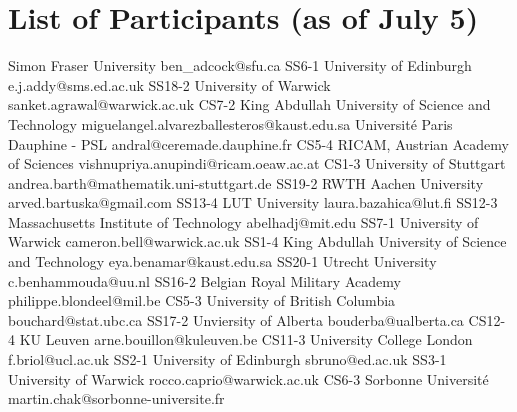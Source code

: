 \chapter{List of Participants (as of July 5)}

\setlength{\columnsep}{1cm}

\begin{multicols}{2}

\small


{ Simon Fraser University }
{ ben_adcock@sfu.ca }
{SS6-1}
{}
{ University of Edinburgh }
{ e.j.addy@sms.ed.ac.uk }
{SS18-2}
{}
{ University of Warwick }
{ sanket.agrawal@warwick.ac.uk }
{CS7-2}
{}
{ King Abdullah University of Science and Technology }
{ miguelangel.alvarezballesteros@kaust.edu.sa }
{}
{}
{ Université Paris Dauphine - PSL }
{ andral@ceremade.dauphine.fr }
{CS5-4}
{}
{ RICAM, Austrian Academy of Sciences }
{ vishnupriya.anupindi@ricam.oeaw.ac.at }
{CS1-3}
{}
{ University of Stuttgart }
{ andrea.barth@mathematik.uni-stuttgart.de }
{SS19-2}
{}
{ RWTH Aachen University }
{ arved.bartuska@gmail.com }
{SS13-4}
{}
{ LUT University }
{ laura.bazahica@lut.fi }
{SS12-3}
{}
{ Massachusetts Institute of Technology }
{ abelhadj@mit.edu }
{SS7-1}
{}
{ University of Warwick }
{ cameron.bell@warwick.ac.uk }
{SS1-4}
{}
{ King Abdullah University of Science and Technology }
{ eya.benamar@kaust.edu.sa }
{SS20-1}
{}
{ Utrecht University }
{ c.benhammouda@uu.nl }
{SS16-2}
{}
{ Belgian Royal Military Academy }
{ philippe.blondeel@mil.be }
{CS5-3}
{}
{ University of British Columbia }
{ bouchard@stat.ubc.ca }
{SS17-2}
{}
{ Unviersity of Alberta }
{ bouderba@ualberta.ca }
{CS12-4}
{}
{ KU Leuven }
{ arne.bouillon@kuleuven.be }
{CS11-3}
{}
{ University College London }
{ f.briol@ucl.ac.uk }
{SS2-1}
{}
{ University of Edinburgh }
{ sbruno@ed.ac.uk }
{SS3-1}
{}
{ University of Warwick }
{ rocco.caprio@warwick.ac.uk }
{CS6-3}
{}
{ Sorbonne Université }
{ martin.chak@sorbonne-universite.fr }

\end{multicols}
